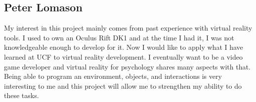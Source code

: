 \documentclass[a4paper,10pt]{article}
\begin{document}
	\subsection{Peter Lomason}
	My interest in this project mainly comes from past experience with virtual reality tools. I used to own an Oculus Rift DK1 and at the time I had it, 
	I was not knowledgeable enough to develop for it. Now I would like to apply what I have learned at UCF to virtual reality development. I eventually want to be
	a video game developer and virtual reality for psychology shares many aspects with that. Being able to program an environment, objects, and interactions is very
	interesting to me and this project will allow me to strengthen my ability to do these tasks.
\pagebreak





\end{document}
